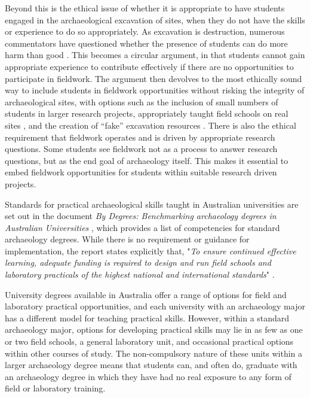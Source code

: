 \documentclass[%
]{ijsra}
\begin{document}
	Beyond this is the ethical issue of whether it is appropriate to have students engaged in the archaeological excavation of sites, when they do not have the skills or experience to do so appropriately. 
	As excavation is destruction, numerous commentators have questioned whether the presence of students can do more harm than good \parencites[48]{hall2005}[216]{pyburn2003}. 
	This becomes a circular argument, in that students cannot gain appropriate experience to contribute effectively if there are no opportunities to participate in fieldwork. 
	The argument then devolves to the most ethically sound way to include students in fieldwork opportunities without risking the integrity of archaeological sites, with options such as the inclusion of small numbers of students in larger research projects, appropriately taught field schools on real sites \parencite{mytum2012c}, 
	and the creation of “fake” excavation resources \parencites{cosgrove2013}{hall2005}. 
	There is also the ethical requirement that fieldwork operates and is driven by appropriate research questions. Some students see fieldwork not as a process to answer research questions, but as the end goal of archaeology itself. 
	This makes it essential to embed fieldwork opportunities for students within suitable research driven projects.
	
	Standards for practical archaeological skills taught in Australian universities are set out in the document \emph{By Degrees: Benchmarking archaeology degrees in Australian Universities} 
	\parencite{beck2008}, which provides a list of competencies for standard archaeology degrees. While there is no requirement or guidance for implementation, the report states explicitly that, 
	"\emph{To ensure continued effective learning, adequate funding is required to design and run field schools and laboratory practicals of the highest national and international standards}" \parencite[9]{beck2008}.
	
	University degrees available in Australia offer a range of options for field and laboratory practical opportunities, and each university with an archaeology major has a different model for teaching practical skills.
	However, within a standard archaeology major, options for developing practical skills may lie in as few as one or two field schools, a general laboratory unit, and occasional practical options within other courses of study. 
	The non-compulsory nature of these units within a larger archaeology degree means that students can, and often do, graduate with an archaeology degree in which they have had no real exposure to any form of field or laboratory training.
	
\end{document}
